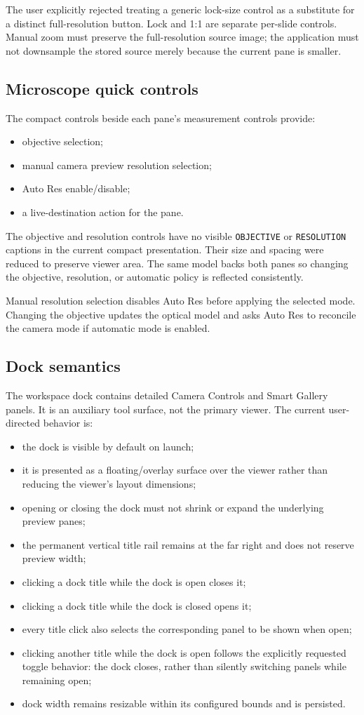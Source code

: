 \documentclass[11pt,a4paper,oneside]{article}
\begin{document}
The user explicitly rejected treating a generic lock-size control as a substitute for a distinct full-resolution button. Lock and 1:1 are separate per-slide controls. Manual zoom must preserve the full-resolution source image; the application must not downsample the stored source merely because the current pane is smaller.

\subsection{Microscope quick controls}
The compact controls beside each pane's measurement controls provide:
\begin{itemize}
  \item objective selection;
  \item manual camera preview resolution selection;
  \item Auto Res enable/disable;
  \item a live-destination action for the pane.
\end{itemize}
The objective and resolution controls have no visible \texttt{OBJECTIVE} or \texttt{RESOLUTION} captions in the current compact presentation. Their size and spacing were reduced to preserve viewer area. The same model backs both panes so changing the objective, resolution, or automatic policy is reflected consistently.

Manual resolution selection disables Auto Res before applying the selected mode. Changing the objective updates the optical model and asks Auto Res to reconcile the camera mode if automatic mode is enabled.

\subsection{Dock semantics}
The workspace dock contains detailed Camera Controls and Smart Gallery panels. It is an auxiliary tool surface, not the primary viewer. The current user-directed behavior is:
\begin{itemize}
  \item the dock is visible by default on launch;
  \item it is presented as a floating/overlay surface over the viewer rather than reducing the viewer's layout dimensions;
  \item opening or closing the dock must not shrink or expand the underlying preview panes;
  \item the permanent vertical title rail remains at the far right and does not reserve preview width;
  \item clicking a dock title while the dock is open closes it;
  \item clicking a dock title while the dock is closed opens it;
  \item every title click also selects the corresponding panel to be shown when open;
  \item clicking another title while the dock is open follows the explicitly requested toggle behavior: the dock closes, rather than silently switching panels while remaining open;
  \item dock width remains resizable within its configured bounds and is persisted.
\end{itemize}
\end{document}
